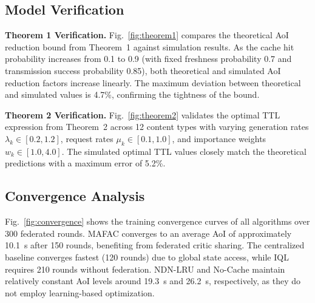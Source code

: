 \documentclass[journal]{IEEEtran}
\begin{document}
\subsection{Model Verification} \label{sec.s1}

\textbf{Theorem 1 Verification.} Fig.~\ref{fig:theorem1} compares the theoretical AoI reduction bound from Theorem~1 against simulation results. As the cache hit probability increases from 0.1 to 0.9 (with fixed freshness probability 0.7 and transmission success probability 0.85), both theoretical and simulated AoI reduction factors increase linearly. The maximum deviation between theoretical and simulated values is 4.7\%, confirming the tightness of the bound.


\textbf{Theorem 2 Verification.} Fig.~\ref{fig:theorem2} validates the optimal TTL expression from Theorem~2 across 12 content types with varying generation rates $\lambda_k \in [0.2, 1.2]$, request rates $\mu_k \in [0.1, 1.0]$, and importance weights $w_k \in [1.0, 4.0]$. The simulated optimal TTL values closely match the theoretical predictions with a maximum error of 5.2\%.


\subsection{Convergence Analysis} \label{sec.s1b}

Fig.~\ref{fig:convergence} shows the training convergence curves of all algorithms over 300 federated rounds. MAFAC converges to an average AoI of approximately 10.1~s after 150 rounds, benefiting from federated critic sharing. The centralized baseline converges fastest (120 rounds) due to global state access, while IQL requires 210 rounds without federation. NDN-LRU and No-Cache maintain relatively constant AoI levels around 19.3~s and 26.2~s, respectively, as they do not employ learning-based optimization.
\end{document}
